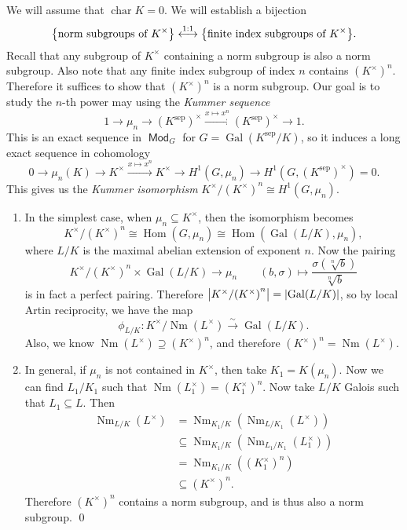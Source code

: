 \documentclass[leqno, openany]{memoir}
\theoremstyle{definition}
\theoremstyle{remark}
\theoremstyle{plain}
\theoremstyle{definition}
\theoremstyle{remark}
\newcommand{\mr}[1]{\mathrm{#1}}
\DeclareMathOperator{\Hom}{Hom}
\DeclareMathOperator{\Gal}{Gal}
\DeclareMathOperator{\Mod}{\mathsf{Mod}}
\DeclareMathOperator{\Nm}{Nm}
\begin{document}
We will assume that $\operatorname{char} K = 0$. We will establish a bijection
\[ \qty{\text{norm subgroups of $K^{\times}$}} \overset{1:1}{\longleftrightarrow} \qty{\text{finite index subgroups of $K^{\times}$}}. \]
Recall that any subgroup of $K^{\times}$ containing a norm subgroup is also a norm subgroup. Also note that any finite index subgroup of index $n$ contains ${(K^{\times})}^n$. Therefore it suffices to show that ${(K^{\times})}^n$ is a norm subgroup. Our goal is to study the $n$-th power may using the \textit{Kummer sequence}
\[ 1 \to \mu_n \to {(K^{\mr{sep}})}^{\times} \xrightarrow{x \mapsto x^n} {(K^{\mr{sep}})}^{\times} \to 1. \]
This is an exact sequence in $\Mod_G$ for $G = \Gal(K^{\mr{sep}}/K)$, so it induces a long exact sequence in cohomology
\[ 0 \to \mu_n(K) \to K^{\times} \xrightarrow{x \mapsto x^n} K^{\times} \to H^1(G, \mu_n) \to H^1(G, {(K^{\mr{sep}})}^{\times}) = 0. \]
This gives us the \textit{Kummer isomorphism} $K^{\times}/{(K^{\times})}^n \cong H^1(G, \mu_n)$.
\begin{enumerate}
    \item In the simplest case, when $\mu_n \subseteq K^{\times}$, then the isomorphism becomes 
        \[ K^{\times}/{(K^{\times})}^n \cong \Hom(G, \mu_n) \cong \Hom(\Gal(L/K), \mu_n), \]
        where $L/K$ is the maximal abelian extension of exponent $n$. Now the pairing
        \[ K^{\times}/{(K^{\times})}^n \times \Gal(L/K) \to \mu_n \qquad (b, \sigma) \mapsto \frac{\sigma(\sqrt[n]{b})}{\sqrt[n]{b}} \]
        is in fact a perfect pairing. Therefore $\abs{K^{\times}/{(K^{\times})}^n} = \abs{\Gal(L/K)}$, so by local Artin reciprocity, we have the map 
        \[ \phi_{L/K} \colon K^{\times}/\Nm(L^{\times}) \xrightarrow{\sim} \Gal(L/K). \]
        Also, we know $\Nm(L^{\times}) \supseteq {(K^{\times})}^n$, and therefore ${(K^{\times})}^n = \Nm(L^{\times})$.
    \item In general, if $\mu_n$ is not contained in $K^{\times}$, then take $K_1 = K(\mu_n)$. Now we can find $L_1/K_1$ such that $\Nm(L_1^{\times}) = {(K_1^{\times})}^n$. Now take $L/K$ Galois such that $L_1 \subseteq L$. Then
        \begin{align*} 
            \Nm_{L/K}(L^{\times}) &= \Nm_{K_1/K} ( \Nm_{L/K_1}(L^{\times}) ) \\
                                  &\subseteq \Nm_{K_1/K}(\Nm_{L_1/K_1}(L_1^{\times})) \\
                                  &= \Nm_{K_1/K}({(K_1^{\times})}^n) \\
                                  &\subseteq {(K^{\times})}^n. 
        \end{align*}
        Therefore ${(K^{\times})}^n$ contains a norm subgroup, and is thus also a norm subgroup. \qed
\end{enumerate}
\end{document}
